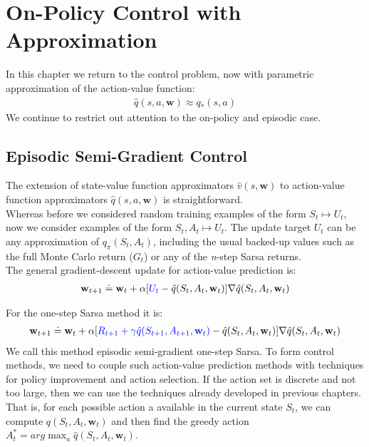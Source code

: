 
\section{On-Policy Control with Approximation}
In this chapter we return to the control problem, now with parametric approximation of the action-value function:
\begin{align}
    \hat{q}(s,a,\mathbf{w})\approx q_*(s,a)
\end{align}
We continue to restrict out attention to the on-policy and episodic case.
\subsection{Episodic Semi-Gradient Control}
The extension of state-value function approximators $\hat{v}(s,\mathbf{w})$ to action-value function approximators $\hat{q}(s,a,\mathbf{w})$ is straightforward.\\

Whereas before we considered random training examples of the form $S_t\mapsto U_t$, now we consider examples of the form $S_t, A_t\mapsto U_t$. The update target $U_t$ can be any approximation of $q_\pi(S_t, A_t)$, including the usual backed-up values such as the full Monte Carlo return ($G_t$) or any
of the \textit{n}-step Sarsa returns.\\

The general gradient-descent update for action-value prediction is:
\begin{align}
    \mathbf{w}_{t+1}\doteq\mathbf{w}_t+\alpha[\textcolor{blue}{U_t}-\hat{q}(S_t, A_t, \mathbf{w}_t)]\nabla \hat{q}(S_t, A_t, \mathbf{w}_t)
\end{align}

For the one-step Sarsa method it is:
\begin{align}
    \mathbf{w}_{t+1}\doteq\mathbf{w}_t+\alpha[\textcolor{blue}{R_{t+1}+\gamma\hat{q}(S_{t+1}, A_{t+1}, \mathbf{w}_t)}-\hat{q}(S_t, A_t, \mathbf{w}_t)]\nabla \hat{q}(S_t, A_t, \mathbf{w}_t)
\end{align}
We call this method episodic semi-gradient one-step Sarsa.
To form control methods, we need to couple such action-value prediction methods with techniques for policy improvement and action selection. If the action set is discrete and not too large, then we can use the techniques already developed in previous chapters. That is, for each possible action a available in the current state $S_t$, we can compute $q(S_t, A_t, \mathbf{w}_t)$ and then find the greedy action $A_t^*=arg\max_a \hat{q}(S_t, A_t, \mathbf{w}_t)$.

